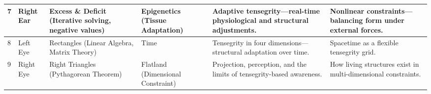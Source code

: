 \documentclass{article}
\begin{document}
\begin{landscape}
\begin{tabular}{|p{1.5cm}|p{2.8cm}|p{3.8cm}|p{3.8cm}|p{5.2cm}|p{5.2cm}|}
7 & 
Right Ear & 
Excess \& Deficit (Iterative solving, negative values) & 
Epigenetics (Tissue Adaptation) & 
Adaptive tensegrity—real-time physiological and structural adjustments. & 
Nonlinear constraints—balancing form under external forces. \\
\hline

8 & 
Left Eye & 
Rectangles (Linear Algebra, Matrix Theory) & 
Time & 
Tensegrity in four dimensions—structural adaptation over time. & 
Spacetime as a flexible tensegrity grid. \\
\hline

9 & 
Right Eye & 
Right Triangles (Pythagorean Theorem) & 
Flatland (Dimensional Constraint) & 
Projection, perception, and the limits of tensegrity-based awareness. & 
How living structures exist in multi-dimensional constraints. \\
\hline

\end{tabular}

\end{landscape}
\end{document}
